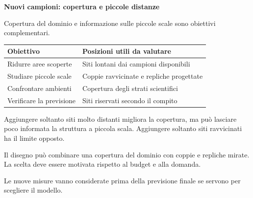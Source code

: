 \documentclass[12pt,aspectratio=1610]{beamer}
\newcommand{\PBody}[1]{\par{\fontsize{11.3}{14.8}\selectfont #1\par}}
\newcommand{\PSmall}[1]{\par{\fontsize{9.8}{13.1}\selectfont #1\par}}
\newcommand{\PInfo}[1]{%
\begin{tcolorbox}[enhanced,arc=1.6mm,boxrule=.55pt,colback=GeoTint,
 colframe=Rule!80!Classical,left=2.3mm,right=2.3mm,top=2mm,bottom=2mm,
 before skip=1mm,after skip=1mm]
\PSmall{#1}\end{tcolorbox}}
\begin{document}
\begin{frame}[plain]\hypertarget{slide89}{}
\begin{lrbox}{\TitleBox}
\begin{minipage}[t]{17.7cm}\raggedright\color{Ink}\fontsize{11.3}{14.8}\selectfont
\color{Navy}\bfseries\fontsize{20.6}{24.5}\selectfont Nuovi campioni: copertura e piccole distanze
\end{minipage}\end{lrbox}

\begin{lrbox}{\RecallBox}
\begin{minipage}[t]{14.3cm}\raggedright\color{Ink}\fontsize{11.3}{14.8}\selectfont
\fontsize{10.3}{13.8}\selectfont Copertura del dominio e informazione sulle piccole scale sono obiettivi complementari.
\end{minipage}\end{lrbox}

\begin{lrbox}{\PilotLeftBox}
\begin{minipage}[t]{10.05cm}\raggedright\color{Ink}\fontsize{11.3}{14.8}\selectfont
{\fontsize{10.2}{13.1}\selectfont\renewcommand{\arraystretch}{1.45}\begin{tabular}{@{}p{4.0cm}p{5.0cm}@{}}\toprule
\textbf{Obiettivo} & \textbf{Posizioni utili da valutare}\\\midrule
Ridurre aree scoperte & Siti lontani dai campioni disponibili\\
Studiare piccole scale & Coppie ravvicinate e repliche progettate\\
Confrontare ambienti & Copertura degli strati scientifici\\
Verificare la previsione & Siti riservati secondo il compito\\
\bottomrule\end{tabular}}

\end{minipage}\end{lrbox}

\begin{lrbox}{\PilotRightBox}
\begin{minipage}[t]{7.55cm}\raggedright\color{Ink}\fontsize{11.3}{14.8}\selectfont
\PBody{Aggiungere soltanto siti molto distanti migliora la copertura, ma può lasciare poco informata la struttura a piccola scala. Aggiungere soltanto siti ravvicinati ha il limite opposto.}
\vspace{2.5mm}
\PInfo{Il disegno può combinare una copertura del dominio con coppie e repliche mirate. La scelta deve essere motivata rispetto al budget e alla domanda.}
\PBody{Le nuove misure vanno considerate prima della previsione finale se servono per scegliere il modello.}
\vspace{2.5mm}


\end{minipage}
\end{lrbox}
\end{frame}
\end{document}

